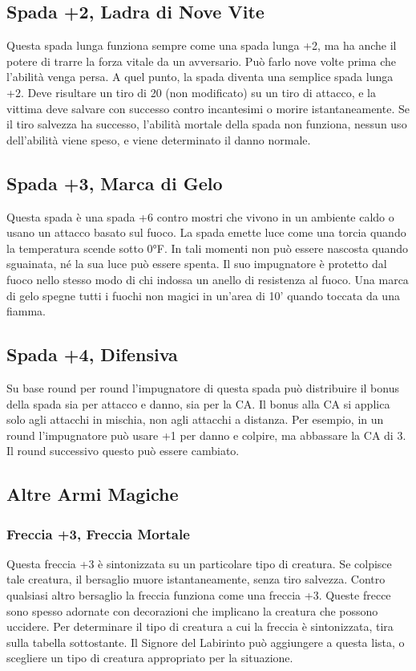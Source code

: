 \documentclass{article}
\begin{document}
\begin{multicols}{2}
\subsection{Spada +2, Ladra di Nove Vite}
Questa spada lunga funziona sempre come una spada lunga +2, ma ha anche il potere di trarre la forza vitale da un avversario. Può farlo nove volte prima che l'abilità venga persa. A quel punto, la spada diventa una semplice spada lunga +2. Deve risultare un tiro di 20 (non modificato) su un tiro di attacco, e la vittima deve salvare con successo contro incantesimi o morire istantaneamente. Se il tiro salvezza ha successo, l'abilità mortale della spada non funziona, nessun uso dell'abilità viene speso, e viene determinato il danno normale.

\subsection{Spada +3, Marca di Gelo}
Questa spada è una spada +6 contro mostri che vivono in un ambiente caldo o usano un attacco basato sul fuoco. La spada emette luce come una torcia quando la temperatura scende sotto 0°F. In tali momenti non può essere nascosta quando sguainata, né la sua luce può essere spenta. Il suo impugnatore è protetto dal fuoco nello stesso modo di chi indossa un anello di resistenza al fuoco. Una marca di gelo spegne tutti i fuochi non magici in un'area di 10' quando toccata da una fiamma.

\subsection{Spada +4, Difensiva}
Su base round per round l'impugnatore di questa spada può distribuire il bonus della spada sia per attacco e danno, sia per la CA. Il bonus alla CA si applica solo agli attacchi in mischia, non agli attacchi a distanza. Per esempio, in un round l'impugnatore può usare +1 per danno e colpire, ma abbassare la CA di 3. Il round successivo questo può essere cambiato.

\subsection{Altre Armi Magiche}

\subsubsection{Freccia +3, Freccia Mortale}
Questa freccia +3 è sintonizzata su un particolare tipo di creatura. Se colpisce tale creatura, il bersaglio muore istantaneamente, senza tiro salvezza. Contro qualsiasi altro bersaglio la freccia funziona come una freccia +3. Queste frecce sono spesso adornate con decorazioni che implicano la creatura che possono uccidere. Per determinare il tipo di creatura a cui la freccia è sintonizzata, tira sulla tabella sottostante. Il Signore del Labirinto può aggiungere a questa lista, o scegliere un tipo di creatura appropriato per la situazione.


\end{multicols}
\end{document}
